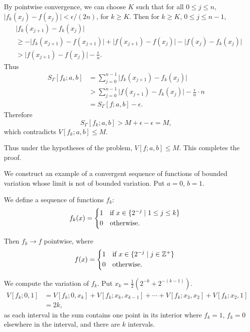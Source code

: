 \documentclass{article}
\begin{document}
By pointwise convergence, we can choose $K$ such that for all $0 \leq j \leq n$, $\lvert f_{k}(x_{j}) - f(x_{j}) \rvert < \epsilon / (2n)$, for $k \geq K$. Then for $k \geq K$, $0 \leq j \leq n-1$, 
\begin{align*}
	&\lvert f_{k}(x_{j+1}) - f_{k}(x_{j}) \rvert \\
    &\geq - \lvert f_{k}(x_{j+1}) - f(x_{j+1}) \rvert + \lvert f(x_{j+1}) - f(x_{j}) \rvert - \lvert f(x_{j}) - f_{k}(x_{j}) \rvert \\
	&> \lvert f(x_{j+1}) - f(x_{j}) \rvert - \frac{\epsilon}{n}.
\end{align*}
Thus 
\begin{align*}
	S_{\Gamma}[f_{k}; a, b] &= \sum_{j = 0}^{n-1} \lvert f_{k}(x_{j+1}) - f_{k}(x_{j}) \rvert \\
	&> \sum_{j = 0}^{n-1} \lvert f(x_{j+1}) - f_{k}(x_{j}) \rvert - \frac{\epsilon}{n} \cdot n \\
	&= S_{\Gamma}[f; a, b] - \epsilon.
\end{align*}
Therefore
\begin{equation*}
	S_{\Gamma}[f_{k}; a, b] > M + \epsilon - \epsilon = M,
\end{equation*}
which contradicts $V[f_{k}; a, b] \leq M$.

Thus under the hypotheses of the problem, $V[f; a, b] \leq M$. This completes the proof.

We construct an example of a convergent sequence of functions of bounded variation whose limit is not of bounded variation. Put $a = 0$, $b = 1$.

We define a sequence of functions $f_{k}$:
\[ f_{k}(x) = \begin{cases*}
		1 & if $x \in \{ 2^{-j} \mid 1 \leq j \leq k \}$ \\
		0 & otherwise. 
		\end{cases*} \]

Then $f_{k} \rightarrow f$ pointwise, where
\[ f(x) = \begin{cases*}
		1 & if $x \in \{ 2^{-j} \mid j \in \mathbb{Z}^{+} \}$ \\
		0 & otherwise. 
		\end{cases*} \]

We compute the variation of $f_{k}$. Put $x_{k} = \frac{1}{2}(2^{-k} + 2^{-(k-1)})$.
\begin{align*}
	V[f_{k}; 0, 1] &= V[f_{k}; 0, x_{k}] + V[f_{k}; x_{k}, x_{k-1}] + \cdots + V[f_{k}; x_{3}, x_{2}] + V[f_{k}; x_{2}, 1] \\
	&= 2k,
\end{align*}
as each interval in the sum contains one point in its interior where $f_{k} = 1$, $f_{k} = 0$ elsewhere in the interval, and there are $k$ intervals.
\end{document}
